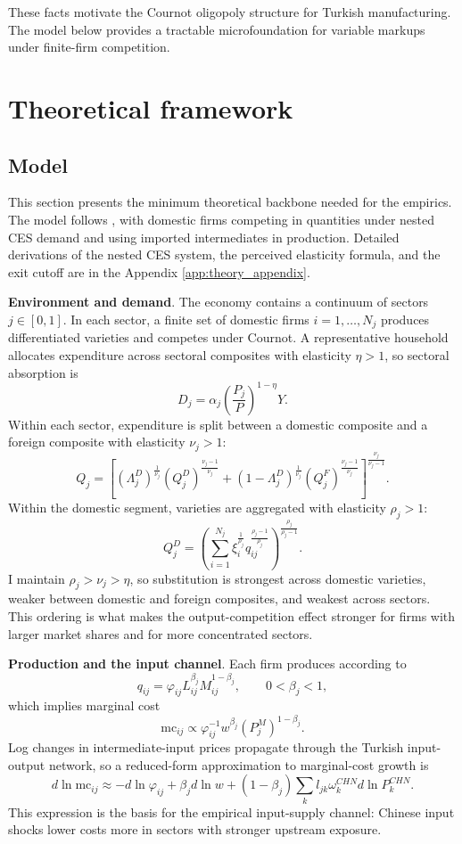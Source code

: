 ﻿\documentclass[12pt]{article}
\begin{document}
These facts motivate the Cournot oligopoly structure for Turkish manufacturing. The model below provides a tractable microfoundation for variable markups under finite-firm competition. 

\section{Theoretical framework}
\label{sec:theory_model}

\subsection{Model}
This section presents the minimum theoretical backbone needed for the empirics. The model follows \textcite{atkesonPricingtoMarketTradeCosts2008, carvalhoProductionNetworksPrimer2019}, with domestic firms competing in quantities under nested CES demand and using imported intermediates in production. Detailed derivations of the nested CES system, the perceived elasticity formula, and the exit cutoff are in the Appendix \ref{app:theory_appendix}.

\textbf{Environment and demand}. The economy contains a continuum of sectors $j \in [0,1]$. In each sector, a finite set of domestic firms $i = 1,\ldots,N_j$ produces differentiated varieties and competes under Cournot. A representative household allocates expenditure across sectoral composites with elasticity $\eta > 1$, so sectoral absorption is
\[
D_j = \alpha_j \left(\frac{P_j}{P}\right)^{1-\eta} Y.
\]
Within each sector, expenditure is split between a domestic composite and a foreign composite with elasticity $\nu_j > 1$:
\[
Q_j = \left[(\Lambda_j^D)^{\frac{1}{\nu_j}} (Q_j^D)^{\frac{\nu_j-1}{\nu_j}} + (1-\Lambda_j^D)^{\frac{1}{\nu_j}} (Q_j^F)^{\frac{\nu_j-1}{\nu_j}}\right]^{\frac{\nu_j}{\nu_j-1}}.
\]
Within the domestic segment, varieties are aggregated with elasticity $\rho_j > 1$:
\[
Q_j^D = \left(\sum_{i=1}^{N_j} \xi_i^{\frac{1}{\rho_j}} q_{ij}^{\frac{\rho_j-1}{\rho_j}} \right)^{\frac{\rho_j}{\rho_j-1}}.
\]
I maintain $\rho_j > \nu_j > \eta$, so substitution is strongest across domestic varieties, weaker between domestic and foreign composites, and weakest across sectors. This ordering is what makes the output-competition effect stronger for firms with larger market shares and for more concentrated sectors.

\textbf{Production and the input channel}. Each firm produces according to
\[
q_{ij} = \varphi_{ij} L_{ij}^{\beta_j} M_{ij}^{1-\beta_j},
\qquad 0<\beta_j<1,
\]
which implies marginal cost
\[
\text{mc}_{ij} \propto \varphi_{ij}^{-1} w^{\beta_j} (P_j^M)^{1-\beta_j}.
\]
Log changes in intermediate-input prices propagate through the Turkish input-output network, so a reduced-form approximation to marginal-cost growth is
\begin{equation}
d \ln \text{mc}_{ij} \approx -d \ln \varphi_{ij} + \beta_j d \ln w + (1-\beta_j) \sum_k l_{jk} \omega_k^{CHN} d \ln P_k^{CHN}.
\label{eq:marginal_cost_io}
\end{equation}
This expression is the basis for the empirical input-supply channel: Chinese input shocks lower costs more in sectors with stronger upstream exposure.
\end{document}
